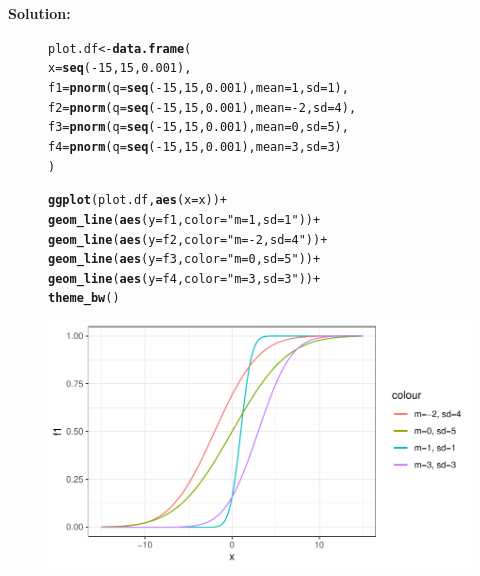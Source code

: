 \documentclass{article}\usepackage[]{graphicx}\usepackage[]{color}
\makeatletter
\def\maxwidth{ %
  \ifdim\Gin@nat@width>\linewidth
    \linewidth
  \else
    \Gin@nat@width
  \fi
}
\newcommand{\hlnum}[1]{\textcolor[rgb]{0.686,0.059,0.569}{#1}}%
\newcommand{\hlstr}[1]{\textcolor[rgb]{0.192,0.494,0.8}{#1}}%
\newcommand{\hlopt}[1]{\textcolor[rgb]{0,0,0}{#1}}%
\newcommand{\hlstd}[1]{\textcolor[rgb]{0.345,0.345,0.345}{#1}}%
\newcommand{\hlkwb}[1]{\textcolor[rgb]{0.69,0.353,0.396}{#1}}%
\newcommand{\hlkwc}[1]{\textcolor[rgb]{0.333,0.667,0.333}{#1}}%
\newcommand{\hlkwd}[1]{\textcolor[rgb]{0.737,0.353,0.396}{\textbf{#1}}}%
\newenvironment{kframe}{%
 \def\at@end@of@kframe{}%
 \ifinner\ifhmode%
  \def\at@end@of@kframe{\end{minipage}}%
  \begin{minipage}{\columnwidth}%
 \fi\fi%
 \def\FrameCommand##1{\hskip\@totalleftmargin \hskip-\fboxsep
 \colorbox{shadecolor}{##1}\hskip-\fboxsep
     \hskip-\linewidth \hskip-\@totalleftmargin \hskip\columnwidth}%
 \MakeFramed {\advance\hsize-\width
   \@totalleftmargin\z@ \linewidth\hsize
   \@setminipage}}%
 {\par\unskip\endMakeFramed%
 \at@end@of@kframe}
\newenvironment{knitrout}{}{} %
\makeatother
\begin{document}
\begin{enumerate}
\begin{enumerate}
	 \textbf{Solution:}\\
\begin{figure}[H]
\begin{center}
\begin{knitrout}
\color{fgcolor}\begin{kframe}
\begin{alltt}
\hlstd{plot.df} \hlkwb{<-} \hlkwd{data.frame}\hlstd{(}
  \hlkwc{x}\hlstd{=}\hlkwd{seq}\hlstd{(}\hlopt{-}\hlnum{15}\hlstd{,} \hlnum{15}\hlstd{,} \hlnum{0.001}\hlstd{),}
  \hlkwc{f1}\hlstd{=}\hlkwd{pnorm}\hlstd{(}\hlkwc{q}\hlstd{=}\hlkwd{seq}\hlstd{(}\hlopt{-}\hlnum{15}\hlstd{,} \hlnum{15}\hlstd{,} \hlnum{0.001}\hlstd{),} \hlkwc{mean}\hlstd{=}\hlnum{1}\hlstd{,} \hlkwc{sd}\hlstd{=}\hlnum{1}\hlstd{),}
  \hlkwc{f2}\hlstd{=}\hlkwd{pnorm}\hlstd{(}\hlkwc{q}\hlstd{=}\hlkwd{seq}\hlstd{(}\hlopt{-}\hlnum{15}\hlstd{,} \hlnum{15}\hlstd{,} \hlnum{0.001}\hlstd{),} \hlkwc{mean}\hlstd{=}\hlopt{-}\hlnum{2}\hlstd{,} \hlkwc{sd}\hlstd{=}\hlnum{4}\hlstd{),}
  \hlkwc{f3}\hlstd{=}\hlkwd{pnorm}\hlstd{(}\hlkwc{q}\hlstd{=}\hlkwd{seq}\hlstd{(}\hlopt{-}\hlnum{15}\hlstd{,} \hlnum{15}\hlstd{,} \hlnum{0.001}\hlstd{),} \hlkwc{mean}\hlstd{=}\hlnum{0}\hlstd{,} \hlkwc{sd}\hlstd{=}\hlnum{5}\hlstd{),}
  \hlkwc{f4}\hlstd{=}\hlkwd{pnorm}\hlstd{(}\hlkwc{q}\hlstd{=}\hlkwd{seq}\hlstd{(}\hlopt{-}\hlnum{15}\hlstd{,} \hlnum{15}\hlstd{,} \hlnum{0.001}\hlstd{),} \hlkwc{mean}\hlstd{=}\hlnum{3}\hlstd{,} \hlkwc{sd}\hlstd{=}\hlnum{3}\hlstd{)}
\hlstd{)}

\hlkwd{ggplot}\hlstd{(plot.df,} \hlkwd{aes}\hlstd{(}\hlkwc{x}\hlstd{=x))}\hlopt{+}
  \hlkwd{geom_line}\hlstd{(}\hlkwd{aes}\hlstd{(}\hlkwc{y}\hlstd{=f1,} \hlkwc{color}\hlstd{=}\hlstr{"m=1, sd=1"}\hlstd{))}\hlopt{+}
  \hlkwd{geom_line}\hlstd{(}\hlkwd{aes}\hlstd{(}\hlkwc{y}\hlstd{=f2,} \hlkwc{color}\hlstd{=}\hlstr{"m=-2, sd=4"}\hlstd{))}\hlopt{+}
  \hlkwd{geom_line}\hlstd{(}\hlkwd{aes}\hlstd{(}\hlkwc{y}\hlstd{=f3,} \hlkwc{color}\hlstd{=}\hlstr{"m=0, sd=5"}\hlstd{))}\hlopt{+}
  \hlkwd{geom_line}\hlstd{(}\hlkwd{aes}\hlstd{(}\hlkwc{y}\hlstd{=f4,} \hlkwc{color}\hlstd{=}\hlstr{"m=3, sd=3"}\hlstd{))}\hlopt{+}
  \hlkwd{theme_bw}\hlstd{()}
\end{alltt}
\end{kframe}
\includegraphics[width=\maxwidth]{figure/unnamed-chunk-4-1} 
\end{knitrout}


\end{center}
\end{figure}
\end{enumerate}
\end{enumerate}
\end{document}
